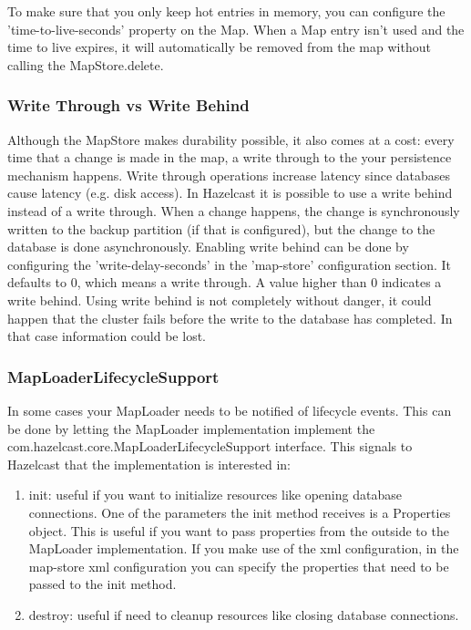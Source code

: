 To make sure that you only keep hot entries in memory, you can configure the 'time-to-live-seconds' property on the Map. When a Map entry isn't used and the time to live expires, it will automatically be removed from the map without calling the MapStore.delete. 

\subsubsection*{Write Through vs Write Behind}
Although the MapStore makes durability possible, it also comes at a cost: every time that a change is made in the map, a write through to the your persistence mechanism happens. Write through operations increase latency since databases cause latency (e.g. disk access). In Hazelcast it is possible to use a write behind instead of a write through. When a change happens, the change is synchronously written to the backup partition (if that is configured), but the change to the database is done asynchronously. Enabling write behind can be done by configuring the 'write-delay-seconds' in the 'map-store' configuration section. It defaults to 0, which means a write through. A value higher than 0 indicates a write behind. Using write behind is not completely without danger, it could happen that the cluster fails before the write to the database has completed. In that case information could be lost.

\subsubsection*{MapLoaderLifecycleSupport}
In some cases your MapLoader needs to be notified of lifecycle events. This can be done by letting the MapLoader implementation implement the com.hazelcast.core.MapLoaderLifecycleSupport interface. This signals to Hazelcast that the implementation is interested in:
\begin{enumerate}
\item init: useful if you want to initialize resources like opening database connections. One of the parameters the init method receives is a Properties object. This is useful if you want to pass properties from the outside to the MapLoader implementation. If you make use of the xml configuration, in the map-store xml configuration you can specify the properties that need to be passed to the init method.
\item destroy: useful if need to cleanup resources like closing database connections.
\end{enumerate}

